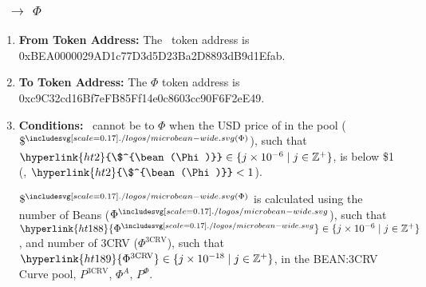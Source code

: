 \documentclass[class=article, crop=false]{standalone}
\begin{document}
\subsubsection{\Bean\ $\rightarrow$ $\Phi$}
    \begin{enumerate}
        \item \textbf{From Token Address:} The \Bean\ token address is 0xBEA0000029AD1c77D3d5D23Ba2D8893dB9d1Efab.
        \item \textbf{To Token Address:} The \hyperlink{ht187}{$\Phi$} token address is 0xc9C32cd16Bf7eFB85Ff14e0c8603cc90F6F2eE49.
        \item \textbf{Conditions:}  \Bean\ cannot be  to  \hyperlink{ht187}{$\Phi$} when the USD price of  in the pool (\hyperlink{ht2}{$\$^{\bean(\Phi)}$}), such that $\hyperlink{ht2}{\$^{\bean(\Phi)}}\in \{j \times 10^{-6} \mid j \in \mathbb{Z}^{+} \}$, is below \$1 (, $\hyperlink{ht2}{\$^{\bean(\Phi)}} < 1$). 

\hyperlink{ht2}{$\$^{\bean(\Phi)}$} is calculated using the number of Beans (\hyperlink{ht188}{$\Phi^{\bean}$}), such that $\hyperlink{ht188}{\Phi^{\bean}} \in \{j \times 10^{-6} \mid j \in \mathbb{Z}^{+} \}$, and number of 3CRV (\hyperlink{ht189}{$\Phi^{\text{3CRV}}$}), such that $\hyperlink{ht189}{\Phi^{\text{3CRV}}} \in \{j \times 10^{-18} \mid j \in \mathbb{Z}^{+} \}$, in the BEAN:3CRV Curve pool, \hyperlink{ht136}{$P^{\text{3CRV}}$}, \hyperlink{ht190}{$\Phi^{A}$}, \hyperlink{ht140}{$P^{\Phi}$}. 


\end{enumerate}
\end{document}
